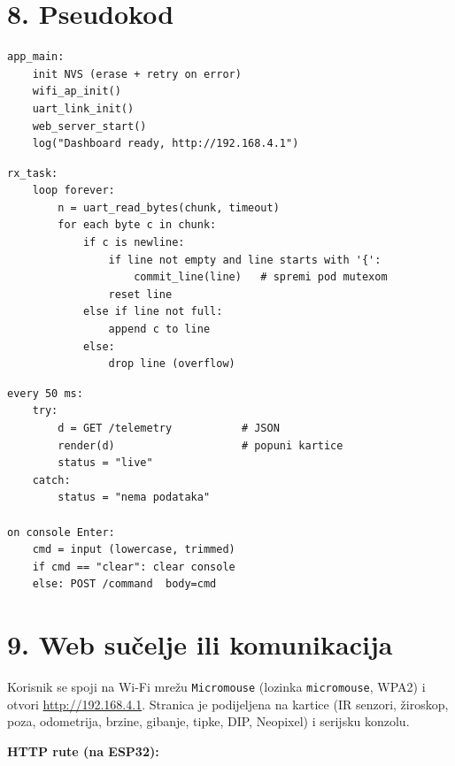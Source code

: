 \documentclass[10pt,a4paper]{article}
\begin{document}
\pagebreak

\section*{8. Pseudokod}

\begin{lstlisting}[caption={Inicijalizacija (app\_main)}]
app_main:
    init NVS (erase + retry on error)
    wifi_ap_init()
    uart_link_init()
    web_server_start()
    log("Dashboard ready, http://192.168.4.1")
	\end{lstlisting}

\begin{lstlisting}[caption={RX task (sastavljanje linija s UART-a)}]
rx_task:
    loop forever:
        n = uart_read_bytes(chunk, timeout)
        for each byte c in chunk:
            if c is newline:
                if line not empty and line starts with '{':
                    commit_line(line)   # spremi pod mutexom
                reset line
            else if line not full:
                append c to line
            else:
                drop line (overflow)
	\end{lstlisting}

\begin{lstlisting}[caption={Preglednik (poll petlja)}]
every 50 ms:
    try:
        d = GET /telemetry           # JSON
        render(d)                    # popuni kartice
        status = "live"
    catch:
        status = "nema podataka"

on console Enter:
    cmd = input (lowercase, trimmed)
    if cmd == "clear": clear console
    else: POST /command  body=cmd
	\end{lstlisting}

\section*{9. Web sučelje ili komunikacija}

Korisnik se spoji na Wi-Fi mrežu \texttt{Micromouse} (lozinka \texttt{micromouse}, WPA2) i otvori \url{http://192.168.4.1}. Stranica je podijeljena na kartice (IR senzori, žiroskop, poza, odometrija, brzine, gibanje, tipke, DIP, Neopixel) i serijsku konzolu.

\textbf{HTTP rute (na ESP32):}
\end{document}
